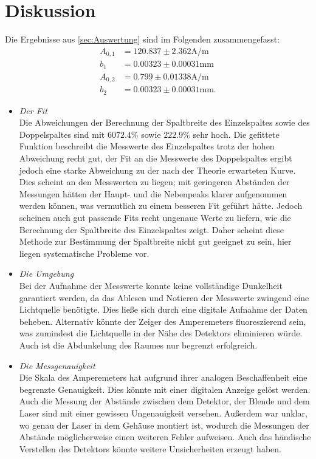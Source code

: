 \section{Diskussion}
\label{sec:Diskussion}
Die Ergebnisse aus \ref{sec:Auswertung} sind im Folgenden zusammengefasst:
\begin{align*}
  A_{0,1} & = 120.837 \pm 2.362 \si{\ampere\per\meter}\\
  b_1     & = 0.00323 \pm 0.00031 \si{\milli\meter} \\
  A_{0,2} & =  0.799 \pm 0.01338 \si{\ampere\per\meter}\\
  b_2     & =  0.00323 \pm 0.00031 \si{\milli\meter}.
\end{align*}

\begin{itemize}
  \item \textit{Der Fit} \\
    Die Abweichungen der Berechnung der Spaltbreite des Einzelspaltes sowie des Doppelspaltes sind mit $6072.4 \si{\percent}$ sowie $222.9 \si{\percent}$ sehr hoch. Die gefittete Funktion beschreibt die
    Messwerte des Einzelspaltes trotz der hohen Abweichung recht gut, der Fit an die Messwerte
    des Doppelspaltes ergibt jedoch eine starke Abweichung zu der nach der Theorie
    erwarteten Kurve. Dies scheint an den Messwerten zu liegen; mit geringeren Abständen der Messungen
    hätten der Haupt- und die Nebenpeaks klarer aufgenommen werden können, was
    vermutlich zu einem besseren Fit geführt hätte. Jedoch scheinen auch gut passende
    Fits recht ungenaue Werte zu liefern, wie die Berechnung der Spaltbreite des
    Einzelspaltes zeigt. Daher scheint diese Methode zur Bestimmung der Spaltbreite
    nicht gut geeignet zu sein, hier liegen systematische Probleme vor.

  \item \textit{Die Umgebung} \\
    Bei der Aufnahme der Messwerte konnte keine vollständige Dunkelheit garantiert
    werden, da das Ablesen und Notieren der Messwerte zwingend eine Lichtquelle
    benötigte. Dies ließe sich durch eine digitale Aufnahme der Daten beheben.
    Alternativ könnte der Zeiger des Amperemeters fluoreszierend sein, was zumindest
    die Lichtquelle in der Nähe des Detektors eliminieren würde. Auch ist die
    Abdunkelung des Raumes nur begrenzt erfolgreich.

  \item \textit{Die Messgenauigkeit} \\
    Die Skala des Amperemeters hat aufgrund ihrer analogen Beschaffenheit eine
    begrenzte Genauigkeit. Dies könnte mit einer digitalen Anzeige gelöst werden.
    Auch die Messung der Abstände zwischen dem Detektor, der Blende und dem Laser
    sind mit einer gewissen Ungenauigkeit versehen. Außerdem war unklar, wo genau
    der Laser in dem Gehäuse montiert ist, wodurch die Messungen der Abstände
    möglicherweise einen weiteren Fehler aufweisen. Auch das händische Verstellen
    des Detektors könnte weitere Unsicherheiten erzeugt haben.


\end{itemize}
